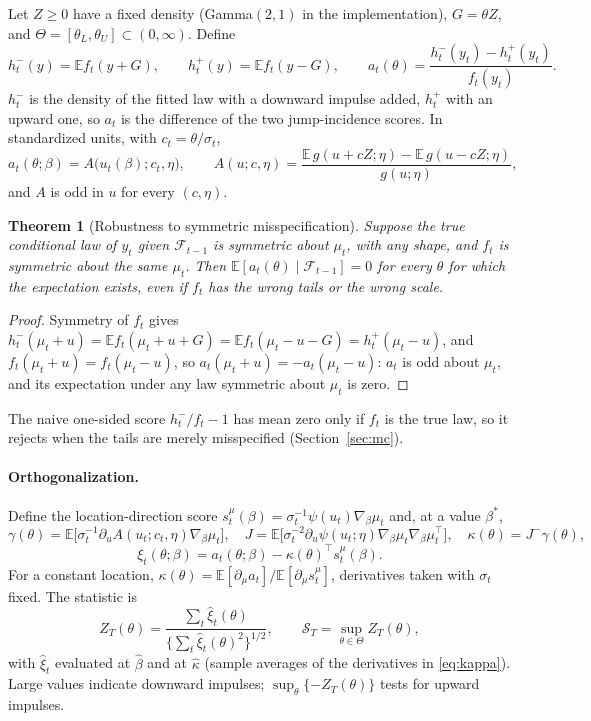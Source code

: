 \documentclass[11pt,a4paper]{article}
\newtheorem{theorem}{Theorem}
\theoremstyle{definition}
\theoremstyle{remark}
\newcommand{\E}{\mathbb{E}}
\newcommand{\F}{\mathcal{F}}
\newcommand{\tr}{^{\top}}
\begin{document}
Let $Z\ge0$ have a fixed density (Gamma$(2,1)$ in the implementation), $G=\theta Z$, and $\Theta=[\theta_L,\theta_U]\subset(0,\infty)$. Define
\[
h^-_t(y)=\E f_t(y+G),\qquad h^+_t(y)=\E f_t(y-G),\qquad a_t(\theta)=\frac{h^-_t(y_t)-h^+_t(y_t)}{f_t(y_t)} .
\]
$h^-_t$ is the density of the fitted law with a downward impulse added, $h^+_t$ with an upward one, so $a_t$ is the difference of the two jump-incidence scores. In standardized units, with $c_t=\theta/\sigma_t$,
\begin{equation}\label{eq:a}
a_t(\theta;\beta)=A\big(u_t(\beta);c_t,\eta\big),\qquad A(u;c,\eta)=\frac{\E\,g(u+cZ;\eta)-\E\,g(u-cZ;\eta)}{g(u;\eta)},
\end{equation}
and $A$ is odd in $u$ for every $(c,\eta)$.

\begin{theorem}[Robustness to symmetric misspecification]\label{thm:symm}
Suppose the true conditional law of $y_t$ given $\F_{t-1}$ is symmetric about $\mu_t$, with any shape, and $f_t$ is symmetric about the same $\mu_t$. Then $\E[a_t(\theta)\mid\F_{t-1}]=0$ for every $\theta$ for which the expectation exists, even if $f_t$ has the wrong tails or the wrong scale.
\end{theorem}
\begin{proof}
Symmetry of $f_t$ gives $h^-_t(\mu_t+u)=\E f_t(\mu_t+u+G)=\E f_t(\mu_t-u-G)=h^+_t(\mu_t-u)$, and $f_t(\mu_t+u)=f_t(\mu_t-u)$, so $a_t(\mu_t+u)=-a_t(\mu_t-u)$: $a_t$ is odd about $\mu_t$, and its expectation under any law symmetric about $\mu_t$ is zero.
\end{proof}
\noindent The naive one-sided score $h^-_t/f_t-1$ has mean zero only if $f_t$ is the true law, so it rejects when the tails are merely misspecified (Section~\ref{sec:mc}).

\paragraph{Orthogonalization.} Define the location-direction score $s^\mu_t(\beta)=\sigma_t^{-1}\psi(u_t)\nabla_\beta\mu_t$ and, at a value $\beta^*$,
\begin{equation}\label{eq:kappa}
\gamma(\theta)=\E\big[\sigma_t^{-1}\partial_uA(u_t;c_t,\eta)\nabla_\beta\mu_t\big],\quad
J=\E\big[\sigma_t^{-2}\partial_u\psi(u_t;\eta)\nabla_\beta\mu_t\nabla_\beta\mu_t\tr\big],\quad
\kappa(\theta)=J^{-}\gamma(\theta),
\end{equation}
\begin{equation}\label{eq:xi}
\xi_t(\theta;\beta)=a_t(\theta;\beta)-\kappa(\theta)\tr s^\mu_t(\beta).
\end{equation}
For a constant location, $\kappa(\theta)=\E[\partial_\mu a_t]/\E[\partial_\mu s^\mu_t]$, derivatives taken with $\sigma_t$ fixed. The statistic is
\begin{equation}\label{eq:stat}
Z_T(\theta)=\frac{\sum_t\hat\xi_t(\theta)}{\{\sum_t\hat\xi_t(\theta)^2\}^{1/2}},\qquad \mathcal S_T=\sup_{\theta\in\Theta}Z_T(\theta),
\end{equation}
with $\hat\xi_t$ evaluated at $\hat\beta$ and at $\hat\kappa$ (sample averages of the derivatives in \eqref{eq:kappa}). Large values indicate downward impulses; $\sup_\theta\{-Z_T(\theta)\}$ tests for upward impulses.
\end{document}
